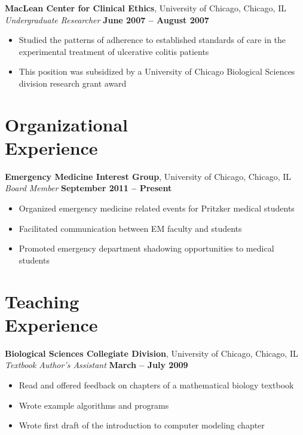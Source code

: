 \documentclass[margin,line]{resume}
\begin{document}
\begin{resume}
    \textbf{MacLean Center for Clinical Ethics}, University of Chicago, Chicago, IL \\\vspace{1mm}%
    \textsl{Undergraduate Researcher} \hfill \textbf{June 2007 -- August 2007}
    \begin{itemize}
    \item Studied the patterns of adherence to established standards of care in the experimental treatment of ulcerative colitis patients
    \item This position was subsidized by a University of Chicago Biological Sciences division research grant award
    \end{itemize}

    \section{\mysidestyle Organizational\\Experience}

    \textbf{Emergency Medicine Interest Group}, University of Chicago, Chicago, IL \\\vspace{1mm}%
    \textsl{Board Member} \hfill \textbf{September 2011 -- Present}\vspace{1mm}%
    \begin{itemize}
    \item Organized emergency medicine related events for Pritzker medical students
    \item Facilitated communication between EM faculty and students
    \item Promoted emergency department shadowing opportunities to medical students
    \end{itemize}


    \section{\mysidestyle Teaching\\Experience}

    \textbf{Biological Sciences Collegiate Division}, University of Chicago, Chicago, IL \\\vspace{1mm}%
    \textsl{Textbook Author's Assistant} \hfill \textbf{March -- July 2009}\vspace{1mm}%
    \begin{itemize}
    \item Read and offered feedback on chapters of a mathematical biology textbook
    \item Wrote example algorithms and programs
    \item Wrote first draft of the introduction to computer modeling chapter
    \end{itemize}


\end{resume}
\end{document}
